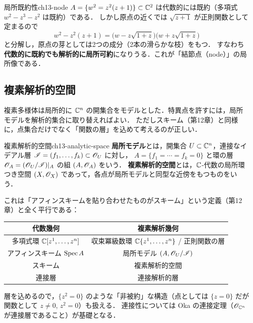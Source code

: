 \begin{myex}{局所既約性}{ch13-node}
$A=\{w^2=z^2(z+1)\}\subset\mathbb{C}^2$ は代数的には既約（多項式 $w^2-z^3-z^2$ は既約）である．
しかし原点の近くでは $\sqrt{z+1}$ が正則関数として定まるので
\begin{equation}
  w^2 - z^2(z+1) = \bigl(w - z\sqrt{1+z}\bigr)\bigl(w+z\sqrt{1+z}\bigr)
\end{equation}
と分解し，原点の芽としては2つの成分（2本の滑らかな枝）をもつ．
すなわち\textbf{代数的に既約でも解析的に局所可約}になりうる．これが「結節点（node）」の局所像である．
\end{myex}

\subsection{複素解析的空間}

複素多様体は局所的に $\mathbb{C}^n$ の開集合をモデルとした．特異点を許すには，局所モデルを解析的集合に取り替えればよい．
ただしスキーム（第12章）と同様に，点集合だけでなく「関数の層」を込めて考えるのが正しい．

\begin{mydef}{複素解析的空間}{ch13-analytic-space}
\textbf{局所モデル}とは，開集合 $U\subset\mathbb{C}^n$，連接なイデアル層 $\mathscr{I}=(f_1,\dots,f_k)\subset\mathscr{O}_U$ に対し，
$A=\{f_1=\cdots=f_k=0\}$ と環の層 $\mathscr{O}_A = (\mathscr{O}_U/\mathscr{I})|_A$ の組 $(A,\mathscr{O}_A)$ をいう．
\textbf{複素解析的空間}とは，$\mathbb{C}$-代数の局所環つき空間 $(X,\mathscr{O}_X)$ であって，各点が局所モデルと同型な近傍をもつものをいう．
\end{mydef}

これは「アフィンスキームを貼り合わせたものがスキーム」という定義（第12章）と全く平行である：
\begin{center}
\begin{tabular}{c|c}
代数幾何 & 複素解析幾何 \\ \hline
多項式環 $\mathbb{C}[z^1,\dots,z^n]$ & 収束冪級数環 $\mathbb{C}\{z^1,\dots,z^n\}$ / 正則関数の層 \\
アフィンスキーム $\operatorname{Spec} A$ & 局所モデル $(A,\mathscr{O}_U/\mathscr{I})$ \\
スキーム & 複素解析的空間 \\
連接層 & 連接解析的層
\end{tabular}
\end{center}
層を込めるので，$\{z^2=0\}$ のような「非被約」な構造（点としては $\{z=0\}$ だが関数として $z\neq0$, $z^2=0$）も扱える．
連接性については Oka の連接定理（$\mathscr{O}_{\mathbb{C}^n}$ が連接層であること）が基礎となる．

